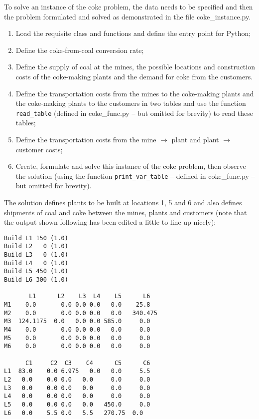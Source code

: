 To solve an instance of the coke problem, the data needs to be specified and then the problem formulated and solved as demonstrated in the file coke\_instance.py.
\begin{enumerate}[leftmargin=0cm,itemindent=0.75cm,labelwidth=.5cm,labelsep=.25cm,labelindent=0cm,align=left]
\item Load the requisite class and functions and define the entry point for Python;


\item Define the coke-from-coal conversion rate;


\item Define the supply of coal at the mines, the possible locations and construction costs of the coke-making plants and the demand for coke from the customers.


\item Define the transportation costs from the mines to the coke-making plants and the coke-making plants to the customers in two tables and use the function \lstinline{read_table} (defined in coke\_func.py -- but omitted for brevity) to read these tables;


\item Define the transportation costs from the mine $\rightarrow$ plant and plant $\rightarrow$ customer costs;


\item Create, formulate and solve this instance of the coke problem, then observe the solution (using the function \lstinline{print_var_table} -- defined in coke\_func.py -- but omitted for brevity).


\end{enumerate}

The solution defines plants to be built at locations 1, 5 and 6 and also defines shipments of coal and coke between the mines, plants and customers (note that the output shown following has been edited a little to line up nicely):
\begin{verbatim}
Build L1 150 (1.0)
Build L2   0 (1.0)
Build L3   0 (1.0)
Build L4   0 (1.0)
Build L5 450 (1.0)
Build L6 300 (1.0)

       L1      L2	 L3	 L4	   L5	   L6
M1 	  0.0	    0.0	0.0	0.0	  0.0	 25.8
M2 	  0.0	    0.0	0.0	0.0	  0.0	340.475
M3 	124.1175  0.0	0.0	0.0	585.0	  0.0
M4 	  0.0	    0.0	0.0	0.0	  0.0	  0.0
M5 	  0.0	    0.0	0.0	0.0	  0.0	  0.0
M6 	  0.0	    0.0	0.0	0.0	  0.0	  0.0

      C1	 C2	 C3	   C4	   C5	   C6
L1 	83.0	0.0	6.975	0.0	  0.0	  5.5
L2 	 0.0	0.0	0.0	  0.0	  0.0	  0.0
L3 	 0.0	0.0	0.0	  0.0	  0.0	  0.0
L4 	 0.0	0.0	0.0	  0.0	  0.0	  0.0
L5 	 0.0	0.0	0.0	  0.0	450.0	  0.0
L6 	 0.0	5.5	0.0	  5.5	270.75  0.0
\end{verbatim}

